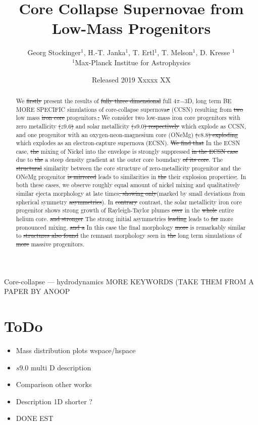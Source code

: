 \documentclass[fleqn,usenatbib]{mnras}
\title{Core Collapse Supernovae from Low-Mass Progenitors}
\author[G. Stockinger et. al]{Georg Stockinger$^1$, H.-T. Janka$^1$, T. Ertl$^1$, T. Melson$^1$, D. Kresse $^1$\\
$^1$Max-Planck Institue for Astrophysics}
\date{Released 2019 Xxxxx XX}
\newcommand{\NY}[2]{{\color{blue}\sout{#1}#2}}
\begin{document}
\maketitle
\pagerange{\pageref{firstpage}--\pageref{lastpage}} 

\begin{abstract}
We \NY{firstly}{} present the results of \NY{fully three dimensional}{ full $4\pi\mathord{-}$3D,} long term \NY{}{BE MORE SPECIFIC} simulations of core-collapse supernova\NY{e}{} (CCSN) \NY{}{resulting} from \NY{two}{} low mass \NY{iron core}{} progenitors.\NY{,}{} \NY{}{We consider two low-mass iron core progenitors} with zero \NY{}{metallicity} \NY{($z9.6$)}{ and} solar metallicity \NY{($s9.0$) respectively}{ which explode as CCSN}, and one progenitor with an oxygen-neon-magnesium core \NY{}{(ONeMg)} \NY{($e8.8$) exploding}{ which explodes} as an electron-capture supernova (ECSN). \NY{We find that}{ In the ECSN case,} \NY{the}{} mixing of Nickel into the envelope is strongly suppressed \NY{in the ECSN case}{} due to \NY{the}{ a} steep density gradient at the outer \NY{}{core} boundary \NY{of its core}{}. The \NY{structural}{} similarity between the \NY{}{core structure of} zero-metallicity progenitor and the ONeMg progenitor \NY{is mirrored}{ leads to similarities} in \NY{the}{ their} explosion properties\NY{,}{.} \NY{}{In both these cases, we observe roughly equal} amount of nickel mixing and \NY{}{qualitatively similar}{} ejecta morphology at late times\NY{, showing only}{(marked by} small \NY{}{deviations from spherical symmetry} \NY{asymmetries}{)}. In \NY{contrary}{ contrast,} the solar metallicity iron core progenitor shows strong growth of Rayleigh-Taylor plumes \NY{over}{ in} the \NY{whole}{ entire} helium core\NY{}{.} \NY{and stronger}{ The strong} initial asymmetries \NY{leading}{ leads} to \NY{far}{} more pronounced mixing\NY{}{.} \NY{and a}{ In this case the} final morphology \NY{more}{ is remarkably} similar to \NY{structures also found}{ the remnant morphology seen in} \NY{the}{} long term simulation\NY{}{s} of \NY{more}{} massive progenitors. 

\end{abstract}

\begin{keywords}
Core-collapse --- hydrodynamics
\NY{}{MORE KEYWORDS (TAKE THEM FROM A PAPER BY ANOOP}
\end{keywords}
\noindent

\section{ToDo}
\begin{itemize}
    \item Mass distribution plots wspace/hspace
    \item $s9.0$ multi D description
    \item Comparison other works
    \item Description 1D shorter ?
    \item DONE EST
\end{itemize}
\end{document}
